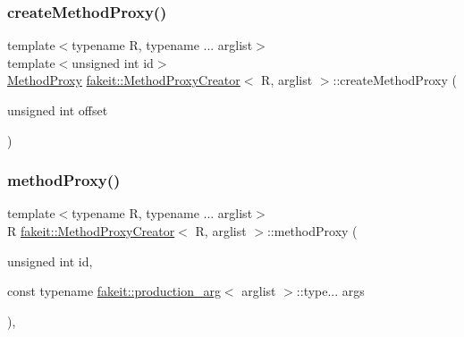 \subsubsection{\texorpdfstring{createMethodProxy()}{createMethodProxy()}\hspace{0.1cm}{\footnotesize\ttfamily [9/9]}}
{\footnotesize\ttfamily template$<$typename R, typename ... arglist$>$ \\
template$<$unsigned int id$>$ \\
\mbox{\hyperlink{structfakeit_1_1MethodProxy}{Method\+Proxy}} \mbox{\hyperlink{classfakeit_1_1MethodProxyCreator}{fakeit\+::\+Method\+Proxy\+Creator}}$<$ R, arglist $>$\+::create\+Method\+Proxy (\begin{DoxyParamCaption}\item[{unsigned int}]{offset }\end{DoxyParamCaption})\hspace{0.3cm}{\ttfamily [inline]}}

\mbox{\label{classfakeit_1_1MethodProxyCreator_a84cda851ca570b88485bee657d21f76d}} 
\subsubsection{\texorpdfstring{methodProxy()}{methodProxy()}\hspace{0.1cm}{\footnotesize\ttfamily [1/9]}}
{\footnotesize\ttfamily template$<$typename R, typename ... arglist$>$ \\
R \mbox{\hyperlink{classfakeit_1_1MethodProxyCreator}{fakeit\+::\+Method\+Proxy\+Creator}}$<$ R, arglist $>$\+::method\+Proxy (\begin{DoxyParamCaption}\item[{unsigned int}]{id,  }\item[{const typename \mbox{\hyperlink{structfakeit_1_1production__arg}{fakeit\+::production\+\_\+arg}}$<$ arglist $>$\+::type...}]{args }\end{DoxyParamCaption})\hspace{0.3cm}{\ttfamily [inline]}, {\ttfamily [protected]}}

\mbox{\label{classfakeit_1_1MethodProxyCreator_a84cda851ca570b88485bee657d21f76d}} 
